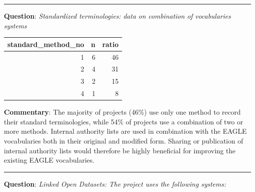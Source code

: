 \documentclass[
  12pt,
]{scrreprt}
\begin{document}
\begin{center}\rule{0.5\linewidth}{0.5pt}\end{center}

\textbf{Question}: \emph{Standardized terminologies: data on combination
of vocabularies systems}

\footnotesize

\begin{longtable}[]{@{}rrr@{}}
\toprule
standard\_method\_no & n & ratio \\
\midrule
\endhead
1 & 6 & 46 \\
2 & 4 & 31 \\
3 & 2 & 15 \\
4 & 1 & 8 \\
\bottomrule
\end{longtable}

\normalsize

\textbf{Commentary}: The majority of projects (46\%) use only one method
to record their standard terminologies, while 54\% of projects use a
combination of two or more methods. Internal authority lists are used in
combination with the EAGLE vocabularies both in their original and
modified form. Sharing or publication of internal authority lists would
therefore be highly beneficial for improving the existing EAGLE
vocabularies.

\begin{center}\rule{0.5\linewidth}{0.5pt}\end{center}

\textbf{Question}: \emph{Linked Open Datasets: The project uses the
following systems:}

\footnotesize
\end{document}
